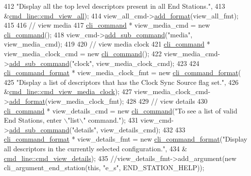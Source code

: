\begin{DoxyCode}
412         \textcolor{stringliteral}{"Display all the top level descriptors present in all End Stations."},
413         &\hyperlink{classcmd__line_a4f2876782cacbec5bdf0fe461e4fecf6}{cmd\_line::cmd\_view\_all});
414     view\_all\_cmd->\hyperlink{classcli__command_aa9ec38e761644d946f8db2b920e39921}{add\_format}(view\_all\_fmt);
415 
416     \textcolor{comment}{// view media}
417     \hyperlink{classcli__command}{cli\_command} * view\_media\_cmd = \textcolor{keyword}{new} \hyperlink{classcli__command}{cli\_command}();
418     view\_cmd->\hyperlink{classcli__command_aa73a67e8ebb6facd4b40ced66279b226}{add\_sub\_command}(\textcolor{stringliteral}{"media"}, view\_media\_cmd);
419 
420     \textcolor{comment}{// view media clock}
421     \hyperlink{classcli__command}{cli\_command} * view\_media\_clock\_cmd = \textcolor{keyword}{new} \hyperlink{classcli__command}{cli\_command}();
422     view\_media\_cmd->\hyperlink{classcli__command_aa73a67e8ebb6facd4b40ced66279b226}{add\_sub\_command}(\textcolor{stringliteral}{"clock"}, view\_media\_clock\_cmd);
423 
424     \hyperlink{classcli__command__format}{cli\_command\_format} * view\_media\_clock\_fmt = \textcolor{keyword}{new} 
      \hyperlink{classcli__command__format}{cli\_command\_format}(
425         \textcolor{stringliteral}{"Display a list of descriptors that has the Clock Sync Source flag set."},
426         &\hyperlink{classcmd__line_a25484a960144a8421a972c552d4b829f}{cmd\_line::cmd\_view\_media\_clock});
427     view\_media\_clock\_cmd->\hyperlink{classcli__command_aa9ec38e761644d946f8db2b920e39921}{add\_format}(view\_media\_clock\_fmt);
428 
429     \textcolor{comment}{// view details}
430     \hyperlink{classcli__command}{cli\_command} * view\_details\_cmd = \textcolor{keyword}{new} \hyperlink{classcli__command}{cli\_command}(\textcolor{stringliteral}{"To see a list of valid End
       Stations, enter \(\backslash\)"list\(\backslash\)" command."});
431     view\_cmd->\hyperlink{classcli__command_aa73a67e8ebb6facd4b40ced66279b226}{add\_sub\_command}(\textcolor{stringliteral}{"details"}, view\_details\_cmd);
432 
433     \hyperlink{classcli__command__format}{cli\_command\_format} * view\_details\_fmt = \textcolor{keyword}{new} 
      \hyperlink{classcli__command__format}{cli\_command\_format}(\textcolor{stringliteral}{"Display all descriptors in the currently selected configuration."},
434                                                                    &
      \hyperlink{classcmd__line_afb1e2fe0ed7b269ad35069f573452766}{cmd\_line::cmd\_view\_details});
435     \textcolor{comment}{//view\_details\_fmt->add\_argument(new cli\_argument\_end\_station(this, "e\_s", END\_STATION\_HELP));}

\end{DoxyCode}
